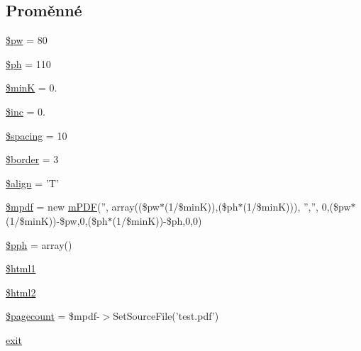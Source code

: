 \subsection*{Proměnné}
\begin{DoxyCompactItemize}
\item 
\hyperlink{example44___m_p_d_f_i__yearbook_8php_a4a84bb9d73addd9e90f2f34c36035df4}{\$pw} = 80
\item 
\hyperlink{example44___m_p_d_f_i__yearbook_8php_ac1d420fcdb8b362b7909b4f257c9b916}{\$ph} = 110
\item 
\hyperlink{example44___m_p_d_f_i__yearbook_8php_a2cd7cb6f9b01bfb0427bd7c4930bf68e}{\$min\-K} = 0.
\item 
\hyperlink{example44___m_p_d_f_i__yearbook_8php_ae62114b42bccd4bae6db688c72000802}{\$inc} = 0.
\item 
\hyperlink{example44___m_p_d_f_i__yearbook_8php_a8cb6ae63c5aaf9108774d2a4310682bc}{\$spacing} = 10
\item 
\hyperlink{example44___m_p_d_f_i__yearbook_8php_abb3c880c6024841924696a2da6c4eb3a}{\$border} = 3
\item 
\hyperlink{example44___m_p_d_f_i__yearbook_8php_a13b48c7a9f88541928ec84660fab1f36}{\$align} = 'T'
\item 
\hyperlink{example44___m_p_d_f_i__yearbook_8php_ad028f81910d6cbab9b184d2214b3a8f8}{\$mpdf} = new \hyperlink{classm_p_d_f}{m\-P\-D\-F}('', array((\$pw$\ast$(1/\$min\-K)),(\$ph$\ast$(1/\$min\-K))), '','', 0,(\$pw$\ast$(1/\$min\-K))-\/\$pw,0,(\$ph$\ast$(1/\$min\-K))-\/\$ph,0,0)
\item 
\hyperlink{example44___m_p_d_f_i__yearbook_8php_a3f03f6724b9353c21fc68cd67f890b8c}{\$pph} = array()
\item 
\hyperlink{example44___m_p_d_f_i__yearbook_8php_a9df17bdad503cfc6595c6b74b38a9f99}{\$html1}
\item 
\hyperlink{example44___m_p_d_f_i__yearbook_8php_ae7ad61c940688f9490c82954465360bb}{\$html2}
\item 
\hyperlink{example44___m_p_d_f_i__yearbook_8php_a905390c82ddf2d57cc0c524f4e5b0425}{\$pagecount} = \$mpdf-\/$>$Set\-Source\-File('test.\-pdf')
\item 
\hyperlink{example44___m_p_d_f_i__yearbook_8php_a6733eb5f605d09eaede9845835d71c4e}{exit}
\end{DoxyCompactItemize}


